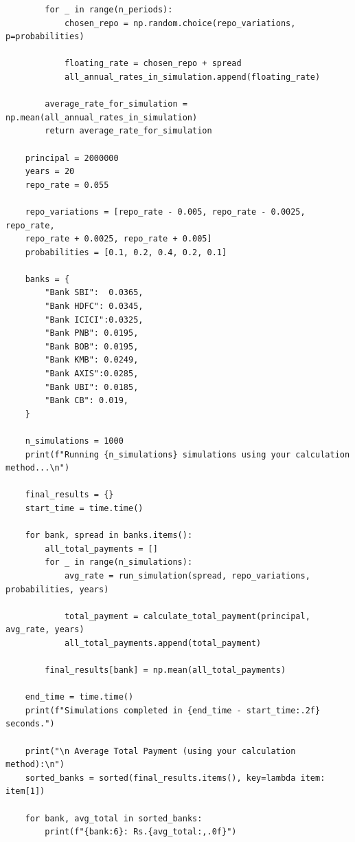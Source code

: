 \begin{itemize}
\begin{verbatim}
        for _ in range(n_periods):
            chosen_repo = np.random.choice(repo_variations, p=probabilities)
    
            floating_rate = chosen_repo + spread
            all_annual_rates_in_simulation.append(floating_rate)
    
        average_rate_for_simulation = np.mean(all_annual_rates_in_simulation)
        return average_rate_for_simulation
    
    principal = 2000000
    years = 20
    repo_rate = 0.055
    
    repo_variations = [repo_rate - 0.005, repo_rate - 0.0025, repo_rate, 
    repo_rate + 0.0025, repo_rate + 0.005]
    probabilities = [0.1, 0.2, 0.4, 0.2, 0.1]
    
    banks = {
        "Bank SBI":  0.0365,
        "Bank HDFC": 0.0345,
        "Bank ICICI":0.0325,
        "Bank PNB": 0.0195,
        "Bank BOB": 0.0195,
        "Bank KMB": 0.0249,
        "Bank AXIS":0.0285,
        "Bank UBI": 0.0185,
        "Bank CB": 0.019,
    }
    
    n_simulations = 1000
    print(f"Running {n_simulations} simulations using your calculation method...\n")
    
    final_results = {}
    start_time = time.time()
    
    for bank, spread in banks.items():
        all_total_payments = []
        for _ in range(n_simulations):
            avg_rate = run_simulation(spread, repo_variations, probabilities, years)
    
            total_payment = calculate_total_payment(principal, avg_rate, years)
            all_total_payments.append(total_payment)
    
        final_results[bank] = np.mean(all_total_payments)
    
    end_time = time.time()
    print(f"Simulations completed in {end_time - start_time:.2f} seconds.")
    
    print("\n Average Total Payment (using your calculation method):\n")
    sorted_banks = sorted(final_results.items(), key=lambda item: item[1])
    
    for bank, avg_total in sorted_banks:
        print(f"{bank:6}: Rs.{avg_total:,.0f}")
\end{verbatim}


\end{itemize}
